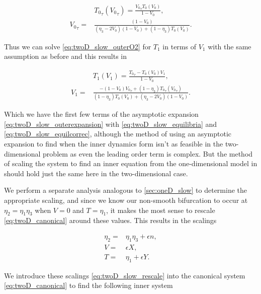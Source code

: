 \begin{equation*}
\begin{aligned}
&{T_0}_\tau({V_0}_\tau)=\frac{{V_0}_\tau T_0(V_0)}{1-V_0},\\
{V_0}_\tau = &\frac{(1-V_0)}{(\eta_3-2V_0)(1-V_0)+(1-\eta_3)T_0(V_0)}.
\end{aligned}
\end{equation*}

Thus we can solve \eqref{eq:twoD_slow_outerO2} for $T_1$ in terms of $V_1$ with the same assumption as before and this results in

\begin{equation}\label{eq:twoD_slow_equilcorrec}
\begin{aligned}
&T_1(V_1) = \frac{{T_0}_\tau-T_0(V_0)V_1}{1-V_0},\\
V_1 =& \frac{-(1-V_0){V_0}_\tau+(1-\eta_3){T_0}_\tau({V_0}_\tau)}{(1-\eta_3)T_0(V_0)+(\eta_3-2V_0)(1-V_0)}.
\end{aligned}
\end{equation}

Which we have the first few terms of the asymptotic expansion \eqref{eq:twoD_slow_outerexpansion} with \eqref{eq:twoD_slow_equilibria} and \eqref{eq:twoD_slow_equilcorrec}, although the method of using an asymptotic expansion to find when the inner dynamics form isn't as feasible in the two-dimensional problem as even the leading order term is complex. But the method of scaling the system to find an inner equation from the one-dimensional model in should hold just the same here in the two-dimensional case.

We perform a separate analysis analogous to \autoref{sec:oneD_slow} to determine the appropriate scaling, and since we know our non-smooth bifurcation to occur at $\eta_2=\eta_1\eta_3$ when $V=0$ and $T=\eta_1$, it makes the most sense to rescale \eqref{eq:twoD_canonical} around these values. This results in the scalings

\begin{equation}\label{eq:twoD_slow_rescale}
\begin{aligned}
\eta_2=&\eta_1\eta_3+\epsilon n,\\
V=&\epsilon X,\\
T=&\eta_1+\epsilon Y.
\end{aligned}
\end{equation}

We introduce these scalings \eqref{eq:twoD_slow_rescale} into the canonical system \eqref{eq:twoD_canonical} to find the following inner system

